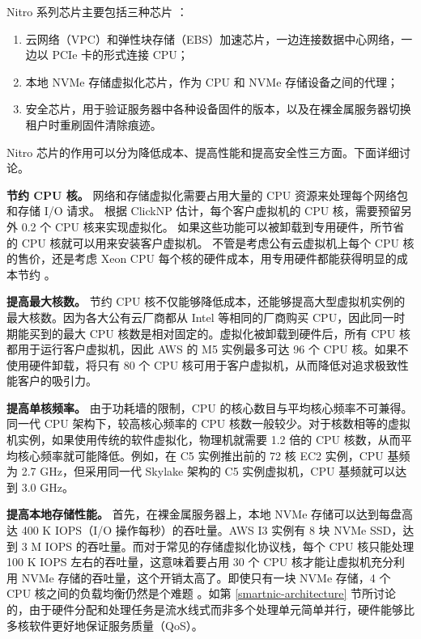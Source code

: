 Nitro 系列芯片主要包括三种芯片 \cite{nitro-blog,nitro-talk,nitro-web}：
\begin{enumerate}
	\item 云网络（VPC）和弹性块存储（EBS）加速芯片，一边连接数据中心网络，一边以 PCIe 卡的形式连接 CPU；
	\item 本地 NVMe 存储虚拟化芯片，作为 CPU 和 NVMe 存储设备之间的代理；
	\item 安全芯片，用于验证服务器中各种设备固件的版本，以及在裸金属服务器切换租户时重刷固件清除痕迹。
\end{enumerate}

Nitro 芯片的作用可以分为降低成本、提高性能和提高安全性三方面。下面详细讨论。

\textbf{节约 CPU 核。}
网络和存储虚拟化需要占用大量的 CPU 资源来处理每个网络包和存储 I/O 请求。
根据 ClickNP \cite{li2016clicknp} 估计，每个客户虚拟机的 CPU 核，需要预留另外 0.2 个 CPU 核来实现虚拟化。
如果这些功能可以被卸载到专用硬件，所节省的 CPU 核就可以用来安装客户虚拟机。
不管是考虑公有云虚拟机上每个 CPU 核的售价，还是考虑 Xeon CPU 每个核的硬件成本，用专用硬件都能获得明显的成本节约 \cite{smartnic}。

\textbf{提高最大核数。}
节约 CPU 核不仅能够降低成本，还能够提高大型虚拟机实例的最大核数。因为各大公有云厂商都从 Intel 等相同的厂商购买 CPU，因此同一时期能买到的最大 CPU 核数是相对固定的。虚拟化被卸载到硬件后，所有 CPU 核都用于运行客户虚拟机，因此 AWS 的 M5 实例最多可达 96 个 CPU 核。如果不使用硬件卸载，将只有 80 个 CPU 核可用于客户虚拟机，从而降低对追求极致性能客户的吸引力。

\textbf{提高单核频率。}
由于功耗墙的限制，CPU 的核心数目与平均核心频率不可兼得。同一代 CPU 架构下，较高核心频率的 CPU 核数一般较少。对于核数相等的虚拟机实例，如果使用传统的软件虚拟化，物理机就需要 1.2 倍的 CPU 核数，从而平均核心频率就可能降低。例如，在 C5 实例推出前的 72 核 EC2 实例，CPU 基频为 2.7 GHz，但采用同一代 Skylake 架构的 C5 实例虚拟机，CPU 基频就可以达到 3.0 GHz。

\textbf{提高本地存储性能。}
首先，在裸金属服务器上，本地 NVMe 存储可以达到每盘高达 400 K IOPS（I/O 操作每秒）的吞吐量。AWS I3 实例有 8 块 NVMe SSD，达到 3 M IOPS 的吞吐量。而对于常见的存储虚拟化协议栈，每个 CPU 核只能处理 100 K IOPS 左右的吞吐量，这意味着要占用 30 个 CPU 核才能让虚拟机充分利用 NVMe 存储的吞吐量，这个开销太高了。即使只有一块 NVMe 存储，4 个 CPU 核之间的负载均衡仍然是个难题 \cite{li2017kv}。如第 \ref{smartnic-architecture} 节所讨论的，由于硬件分配和处理任务是流水线式而非多个处理单元简单并行，硬件能够比多核软件更好地保证服务质量（QoS）。


